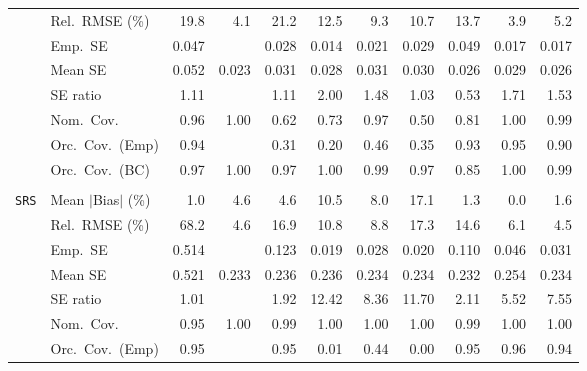 \begin{landscape}
\begin{longtable}{llrrrrrrrrr}
 & Rel.\ RMSE (\%) & 19.8 & \cellcolor{ranktwo}4.1 & 21.2 & 12.5 & 9.3 & 10.7 & 13.7 & \cellcolor{rankone}3.9 & \cellcolor{rankthree}5.2 \\
 & Emp.\ SE & 0.047 &  & 0.028 & 0.014 & 0.021 & 0.029 & 0.049 & 0.017 & 0.017 \\
 & Mean SE & 0.052 & 0.023 & 0.031 & 0.028 & 0.031 & 0.030 & 0.026 & 0.029 & 0.026 \\
 & SE ratio & \cellcolor{ranktwo}1.11 &  & \cellcolor{ranktwo}1.11 & 2.00 & 1.48 & \cellcolor{rankone}1.03 & \cellcolor{rankthree}0.53 & 1.71 & 1.53 \\
 & Nom.\ Cov. & \cellcolor{rankone}0.96 & 1.00 & 0.62 & 0.73 & \cellcolor{ranktwo}0.97 & 0.50 & 0.81 & 1.00 & \cellcolor{rankthree}0.99 \\
 & Orc.\ Cov.\ (Emp) & \cellcolor{ranktwo}0.94 &  & 0.31 & 0.20 & 0.46 & 0.35 & \cellcolor{rankthree}0.93 & \cellcolor{rankone}0.95 & 0.90 \\
 & Orc.\ Cov.\ (BC) & \cellcolor{rankone}0.97 & \cellcolor{rankthree}1.00 & \cellcolor{rankone}0.97 & \cellcolor{rankthree}1.00 & \cellcolor{ranktwo}0.99 & \cellcolor{rankone}0.97 & 0.85 & \cellcolor{rankthree}1.00 & \cellcolor{ranktwo}0.99 \\
\addlinespace[2pt]
\multicolumn{11}{l}{\textbf{Binary \& Categorical Phase-One Covariates}} \\
\addlinespace[2pt]
\quad \texttt{SRS} & Mean $|$Bias$|$ (\%) & \cellcolor{ranktwo}1.0 & 4.6 & 4.6 & 10.5 & 8.0 & 17.1 & \cellcolor{rankthree}1.3 & \cellcolor{rankone}0.0 & 1.6 \\
 & Rel.\ RMSE (\%) & 68.2 & \cellcolor{ranktwo}4.6 & 16.9 & 10.8 & 8.8 & 17.3 & 14.6 & \cellcolor{rankthree}6.1 & \cellcolor{rankone}4.5 \\
 & Emp.\ SE & 0.514 &  & 0.123 & 0.019 & 0.028 & 0.020 & 0.110 & 0.046 & 0.031 \\
 & Mean SE & 0.521 & 0.233 & 0.236 & 0.236 & 0.234 & 0.234 & 0.232 & 0.254 & 0.234 \\
 & SE ratio & \cellcolor{rankone}1.01 &  & \cellcolor{ranktwo}1.92 & 12.42 & 8.36 & 11.70 & \cellcolor{rankthree}2.11 & 5.52 & 7.55 \\
 & Nom.\ Cov. & \cellcolor{rankone}0.95 & \cellcolor{rankthree}1.00 & \cellcolor{ranktwo}0.99 & \cellcolor{rankthree}1.00 & \cellcolor{rankthree}1.00 & \cellcolor{rankthree}1.00 & \cellcolor{ranktwo}0.99 & \cellcolor{rankthree}1.00 & \cellcolor{rankthree}1.00 \\
 & Orc.\ Cov.\ (Emp) & \cellcolor{rankone}0.95 &  & \cellcolor{rankone}0.95 & 0.01 & \cellcolor{rankthree}0.44 & 0.00 & \cellcolor{rankone}0.95 & \cellcolor{ranktwo}0.96 & \cellcolor{ranktwo}0.94 \\

\end{longtable}
\end{landscape}
